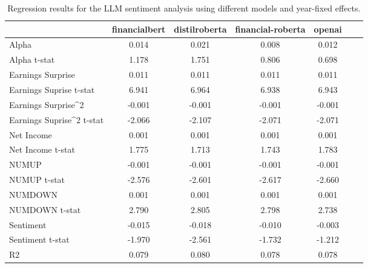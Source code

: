\begin{table}
\caption{Regression results for the LLM sentiment analysis using different models and year-fixed effects.}
\label{tab:llm_regressions_year_fixed}
\begin{tabular}{lcccccc}
\toprule
 & financialbert & distilroberta & financial-roberta & openai \\
\midrule
Alpha & 0.014 & 0.021 & 0.008 & 0.012 \\
Alpha t-stat & 1.178 & 1.751 & 0.806 & 0.698 \\
Earnings Surprise & 0.011 & 0.011 & 0.011 & 0.011 \\
Earnings Suprise t-stat & 6.941 & 6.964 & 6.938 & 6.943 \\
Earnings Surprise^2 & -0.001 & -0.001 & -0.001 & -0.001 \\
Earnings Suprise^2 t-stat & -2.066 & -2.107 & -2.071 & -2.071 \\
Net Income & 0.001 & 0.001 & 0.001 & 0.001 \\
Net Income t-stat & 1.775 & 1.713 & 1.743 & 1.783 \\
NUMUP & -0.001 & -0.001 & -0.001 & -0.001 \\
NUMUP t-stat & -2.576 & -2.601 & -2.617 & -2.660 \\
NUMDOWN & 0.001 & 0.001 & 0.001 & 0.001 \\
NUMDOWN t-stat & 2.790 & 2.805 & 2.798 & 2.738 \\
Sentiment & -0.015 & -0.018 & -0.010 & -0.003 \\
Sentiment t-stat & -1.970 & -2.561 & -1.732 & -1.212 \\
R2 & 0.079 & 0.080 & 0.078 & 0.078 \\
\bottomrule
\end{tabular}
\end{table}

